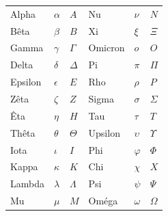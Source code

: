 \documentclass[../../../include/open-logic-chapter]{subfiles}
\begin{document}

\begin{center}
    \begin{tabular}{lll@{\qquad}lll}
    Alpha & $\alpha$ & $A$ &
    Nu & $\nu$ & $N$ \\
    Bêta & $\beta$ & $B$ &
    Xi & $\xi$ & $\Xi$ \\
    Gamma & $\gamma$ & $\Gamma$ &
    Omicron & $o$ & $O$ \\
    Delta & $\delta$ & $\Delta$ &
    Pi & $\pi$ & $\Pi$ \\
    Epsilon & $\epsilon$ & $E$ &
    Rho & $\rho$ & $P$ \\
    Zêta & $\zeta$ & $Z$ &
    Sigma & $\sigma$ & $\Sigma$ \\
    Êta & $\eta$ & $H$ &
    Tau & $\tau$ & $T$ \\
    Thêta & $\theta$ & $\Theta$ &
    Upsilon & $\upsilon$ & $\Upsilon$ \\
    Iota & $\iota$ & $I$ &
    Phi & $\varphi$ & $\Phi$ \\
    Kappa & $\kappa$ & $K$ &
    Chi & $\chi$ & $X$ \\
    Lambda & $\lambda$ & $\Lambda$ &
    Psi & $\psi$ & $\Psi$ \\
    Mu & $\mu$ & $M$ &
    Oméga & $\omega$ & $\Omega$
    \end{tabular}
\end{center}
\end{document}

